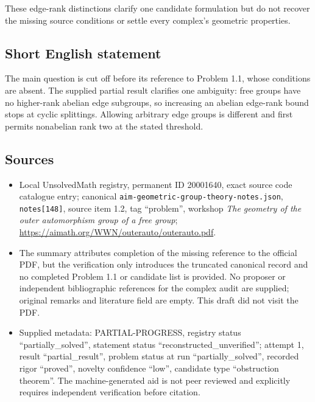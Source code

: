 \documentclass[11pt]{article}
\begin{document}
These edge-rank distinctions clarify one candidate formulation but do not recover the missing source conditions or settle every complex's geometric properties.
\subsection{Short English statement}
The main question is cut off before its reference to Problem 1.1, whose conditions are absent. The supplied partial result clarifies one ambiguity: free groups have no higher-rank abelian edge subgroups, so increasing an abelian edge-rank bound stops at cyclic splittings. Allowing arbitrary edge groups is different and first permits nonabelian rank two at the stated threshold.
\subsection{Sources}
\begin{itemize}
\item Local UnsolvedMath registry, permanent ID 20001640, exact source code catalogue entry; canonical \texttt{aim-geometric-group-theory-notes.json}, \texttt{notes[148]}, source item 1.2, tag ``problem'', workshop \emph{The geometry of the outer automorphism group of a free group}; \url{https://aimath.org/WWN/outerauto/outerauto.pdf}.
\item The summary attributes completion of the missing reference to the official PDF, but the verification only introduces the truncated canonical record and no completed Problem 1.1 or candidate list is provided. No proposer or independent bibliographic references for the complex audit are supplied; original remarks and literature field are empty. This draft did not visit the PDF.
\item Supplied metadata: PARTIAL-PROGRESS, registry status ``partially\_solved'', statement status ``reconstructed\_unverified''; attempt 1, result ``partial\_result'', problem status at run ``partially\_solved'', recorded rigor ``proved'', novelty confidence ``low'', candidate type ``obstruction theorem''. The machine-generated aid is not peer reviewed and explicitly requires independent verification before citation.
\end{itemize}
\end{document}
